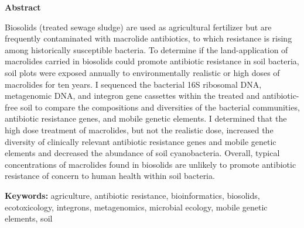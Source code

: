 \Large\begin{center}\textbf{Abstract}\end{center}\normalsize

\noindent

Biosolids (treated sewage sludge) are used as agricultural fertilizer but are frequently contaminated with macrolide antibiotics, to which resistance is rising among historically susceptible bacteria.
To determine if the land-application of macrolides carried in biosolids could promote antibiotic resistance in soil bacteria, soil plots were exposed annually to environmentally realistic or high doses of macrolides for ten years.
I sequenced the bacterial 16S ribosomal DNA, metagenomic DNA, and integron gene cassettes within the treated and antibiotic-free soil to compare the compositions and diversities of the bacterial communities, antibiotic resistance genes, and mobile genetic elements.
I determined that the high dose treatment of macrolides, but not the realistic dose, increased the diversity of clinically relevant antibiotic resistance genes and mobile genetic elements and decreased the abundance of soil cyanobacteria.
Overall, typical concentrations of macrolides found in biosolids are unlikely to promote antibiotic resistance of concern to human health within soil bacteria.

\vfill

\noindent\textbf{Keywords:} agriculture, antibiotic resistance, bioinformatics, biosolids, ecotoxicology, integrons, metagenomics, microbial ecology, mobile genetic elements, soil
